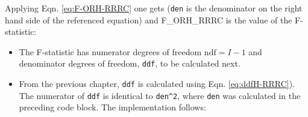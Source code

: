 \documentclass[
]{book}
\newenvironment{Shaded}{\begin{snugshade}}{\end{snugshade}}
\newcommand{\CommentTok}[1]{\textcolor[rgb]{0.56,0.35,0.01}{\textit{#1}}}
\newcommand{\DataTypeTok}[1]{\textcolor[rgb]{0.13,0.29,0.53}{#1}}
\newcommand{\DecValTok}[1]{\textcolor[rgb]{0.00,0.00,0.81}{#1}}
\newcommand{\KeywordTok}[1]{\textcolor[rgb]{0.13,0.29,0.53}{\textbf{#1}}}
\newcommand{\NormalTok}[1]{#1}
\newcommand{\OperatorTok}[1]{\textcolor[rgb]{0.81,0.36,0.00}{\textbf{#1}}}
\newcommand{\StringTok}[1]{\textcolor[rgb]{0.31,0.60,0.02}{#1}}
\providecommand{\tightlist}{%
  \setlength{\itemsep}{0pt}\setlength{\parskip}{0pt}}
\begin{document}
Applying Eqn. \eqref{eq:F-ORH-RRRC} one gets (\texttt{den} is the denominator on the right hand side of the referenced equation) and F\_ORH\_RRRC is the value of the F-statistic:

\begin{Shaded}
\end{Shaded}

\begin{itemize}
\tightlist
\item
  The F-statistic has numerator degrees of freedom \(\text{ndf} = I - 1\) and denominator degrees of freedom, \texttt{ddf}, to be calculated next.
\item
  From the previous chapter, \texttt{ddf} is calculated using Eqn. \eqref{eq:ddfH-RRRC}). The numerator of \texttt{ddf} is identical to \texttt{den\^{}2}, where \texttt{den} was calculated in the preceding code block. The implementation follows:
\end{itemize}

\begin{Shaded}
\end{Shaded}
\end{document}
